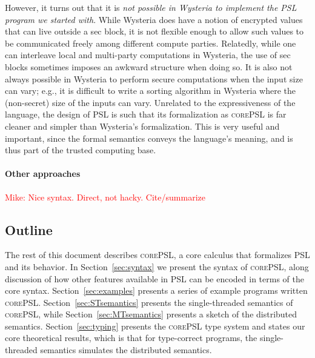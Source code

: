 \documentclass[10pt]{article}
\newcommand{\lang}{\textsc{corePSL}\xspace}
\newcommand{\mwh}[1]{\textcolor{red}{Mike: #1}}
\begin{document}
However, it turns out that it is \emph{not possible in Wysteria to implement the
PSL program we started with}. While Wysteria does have a notion of
encrypted values that can live outside a sec block, it is not flexible
enough to allow such values to be communicated freely among different
compute parties. Relatedly, while one can interleave local and
multi-party computations in Wysteria, the use of sec blocks sometimes
imposes an awkward structure when doing so. It is also not always
possible in Wysteria to perform secure computations when the input
size can vary; e.g., it is difficult to write a sorting algorithm in
Wysteria where the (non-secret) size of the inputs can vary. Unrelated
to the expressiveness of the language, the design of PSL is such that
its formalization as \lang is far cleaner and simpler than Wysteria's
formalization. This is very useful and important, since the
formal semantics conveys the language's meaning, and is thus part of
the trusted computing base.

\paragraph{Other approaches}

\mwh{Nice syntax. Direct, not hacky. Cite/summarize}

\subsection{Outline}

The rest of this document describes \lang, a core calculus that
formalizes PSL and its behavior. In Section~\ref{sec:syntax} we
present the syntax of \lang, along discussion of how other features
available in PSL can be encoded in terms of the core
syntax. Section~\ref{sec:examples} presents a series of example
programs written \lang. Section~\ref{sec:STsemantics} presents the
single-threaded semantics of \lang, while
Section~\ref{sec:MTsemantics} presents a sketch of the distributed
semantics. Section~\ref{sec:typing} presents the \lang type system and
states our core theoretical results, which is that for type-correct
programs, the single-threaded semantics simulates the distributed
semantics.
\end{document}
